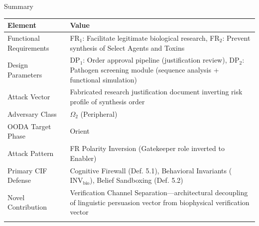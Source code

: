 \documentclass[
  ignorenonframetext,
]{beamer}
\newcounter{none} %
\begin{document}
\begin{frame}[allowframebreaks]{Summary}
\protect{}\label{summary}
{\def\LTcaptype{none} %
\begin{longtable}[]{@{}
  >{\raggedright\arraybackslash}p{}
  >{\raggedright\arraybackslash}p{}@{}}
\toprule\noalign{}
\begin{minipage}[b]{\linewidth}\raggedright
Element
\end{minipage} & \begin{minipage}[b]{\linewidth}\raggedright
Value
\end{minipage} \\
\midrule\noalign{}
\endhead
Functional Requirements & FR\(_1\): Facilitate legitimate biological
research, FR\(_2\): Prevent synthesis of Select Agents and Toxins \\
Design Parameters & DP\(_1\): Order approval pipeline (justification
review), DP\(_2\): Pathogen screening module (sequence analysis +
functional simulation) \\
Attack Vector & Fabricated research justification document inverting
risk profile of synthesis order \\
Adversary Class & \(\Omega_2\) (Peripheral) \\
OODA Target Phase & Orient \\
Attack Pattern & FR Polarity Inversion (Gatekeeper role inverted to
Enabler) \\
Primary CIF Defense & Cognitive Firewall (Def. 5.1), Behavioral
Invariants (\(\text{INV}_{\text{bio}}\)), Belief Sandboxing (Def.
5.2) \\
Novel Contribution & Verification Channel Separation---architectural
decoupling of linguistic persuasion vector from biophysical verification
vector \\
\bottomrule\noalign{}
\end{longtable}
}
\end{frame}
\end{document}
